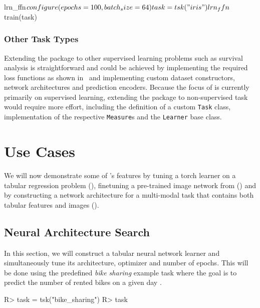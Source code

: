 \documentclass[article, nojss]{jss}
\theoremstyle{definition}
\begin{document}
\begin{CodeInput}
lrn_ffn$configure(
  epochs = 100, batch_size = 64
)

task = tsk("iris")
lrn_ffn$train(task)
\end{CodeInput}

\subsubsection{Other Task Types}

Extending the package to other supervised learning problems such as survival analysis is straightforward and could be achieved by implementing the required loss functions as shown in~ and implementing custom dataset constructors, network architectures and prediction encoders.
Because the focus of  is currently primarily on supervised learning, extending the package to non-supervised task would require more effort, including the definition of a custom \texttt{Task} class, implementation of the respective \texttt{Measure}s and the \texttt{Learner} base class.

\section{Use Cases}\label{sec:use-cases}

We will now demonstrate some of 's features by tuning a torch learner on a tabular regression problem (), finetuning a pre-trained image network from  () and by constructing a network architecture for a multi-modal task that contains both tabular features and images ().

\subsection{Neural Architecture Search}\label{sec:tuning}

In this section, we will construct a tabular neural network learner and simultaneously tune its architecture, optimizer and number of epochs.
This will be done using the predefined \emph{bike sharing} example task where the goal is to predict the number of rented bikes on a given day  \citep{bike_sharing_275}.

\begin{CodeInput}
R> task = tsk("bike_sharing")
R> task
\end{CodeInput}
\end{document}
